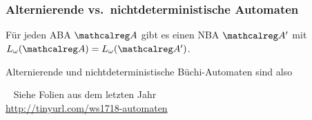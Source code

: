   \AtBeginSection{}
  \section*{}

  \begin{frame}
    \frametitle{Alternierende vs.\ nichtdeterministische Automaten}
    
    \begin{Satz}
      Für jeden ABA $\Aut{A}$ gibt es einen NBA $\Aut{A}'$ mit $L_\omega(\Aut{A})=L_\omega(\Aut{A}')$.
      \label{thm:ABAvsNBA}
    \end{Satz}
    
    \parII
    Alternierende und nichtdeterministische Büchi-Automaten
    sind also 
    
    \parIII
    ~ Siehe Folien aus dem letzten Jahr \\
    \url{http://tinyurl.com/ws1718-automaten}

  \end{frame}

